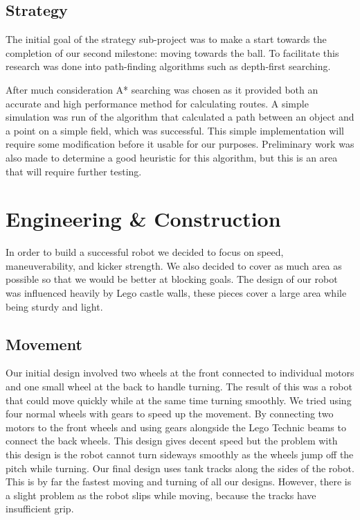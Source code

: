 \documentclass[12pt, a4paper, titlepage]{article}
\begin{document}
\subsection{Strategy}

The initial goal of the strategy sub-project was to make a start towards the
completion of our second milestone: moving towards the ball. To facilitate this
research was done into path-finding algorithms such as depth-first searching.

After much consideration A* searching was chosen as it provided both an accurate
and high performance method for calculating routes. A simple simulation was
run of the algorithm that calculated a path between an object and a point on a
simple field, which was successful. This simple implementation will require some
modification before it usable for our purposes. Preliminary work was also made
to determine a good heuristic for this algorithm, but this is an area that will
require further testing.

\section{Engineering \& Construction}

In order to build a successful robot we decided to focus on speed,
maneuverability, and kicker strength. We also decided to cover as much area as
possible so that we would be better at blocking goals. The design of our robot
was influenced heavily by Lego castle walls, these pieces cover a large area
while being sturdy and light.

\subsection{Movement}

Our initial design involved two wheels at the front connected to individual
motors and one small wheel at the back to handle turning. The result
of this was a robot that could move quickly while at the same time turning
smoothly. We tried using four normal wheels with gears to speed up the movement.
By connecting two motors to the front wheels and using gears alongside the
Lego Technic beams to connect the back wheels. This design gives decent speed
but the problem with this design is the robot cannot turn sideways smoothly as
the wheels jump off the pitch while turning. Our final design uses tank tracks
along the sides of the robot. This is by far the fastest moving and turning of
all our designs. However, there is a slight problem as the robot slips while
moving, because the tracks have insufficient grip.
\end{document}
